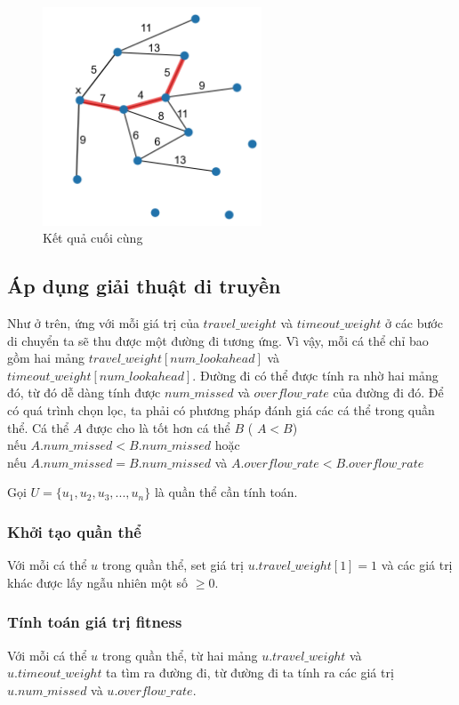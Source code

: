\documentclass[12pt]{report}
\begin{document}
\begin{figure}[H]
\caption{Kết quả cuối cùng}
\centering
\includegraphics[width=6.5cm]{final.png}
\end{figure}

\subsection{Áp dụng giải thuật di truyền}
Như ở trên, ứng với mỗi giá trị của $travel\_weight$ và $timeout\_weight$ ở các bước di chuyển ta sẽ thu được một đường đi tương ứng. Vì vậy, mỗi cá thể chỉ bao gồm hai mảng $travel\_weight[num\_lookahead]$ và $timeout\_weight[num\_lookahead]$. Đường đi có thể được tính ra nhờ hai mảng đó, từ đó dễ dàng tính được $num\_missed$ và $overflow\_rate$ của đường đi đó. 
Để có quá trình chọn lọc, ta phải có phương pháp đánh giá các cá thể trong quần thể. Cá thể $A$ được cho là tốt hơn cá thể $B$ ( $A < B$) \\
nếu $A.num\_missed < B.num\_missed$ hoặc \\
nếu $A.num\_missed = B.num\_missed$ và $A.overflow\_rate < B.overflow\_rate$

\vspace{10mm}
Gọi $U = \{u_1, u_2, u_3, ..., u_n\}$ là quần thể cần tính toán.   

\subsubsection{Khởi tạo quần thể}
Với mỗi cá thể $u$ trong quần thể, set giá trị $u.travel\_weight[1] = 1$ và các giá trị khác được lấy ngẫu nhiên một số $ \geq 0$.
\subsubsection{Tính toán giá trị fitness}
Với mỗi cá thể $u$ trong quần thể, từ hai mảng $u.travel\_weight$ và $u.timeout\_weight$ ta tìm ra đường đi, từ đường đi ta tính ra các giá trị $u.num\_missed$ và $u.overflow\_rate$.
\end{document}
